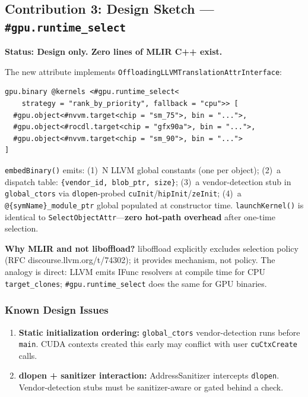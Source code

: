 \documentclass[10pt]{article}
\begin{document}
\subsection{Contribution 3: Design Sketch --- \texttt{\#gpu.runtime\_select}}

\textbf{Status: Design only. Zero lines of MLIR C++ exist.}

The new attribute implements \texttt{OffloadingLLVMTranslationAttrInterface}:

\begin{lstlisting}[language=MLIR]
gpu.binary @kernels <#gpu.runtime_select<
    strategy = "rank_by_priority", fallback = "cpu">> [
  #gpu.object<#nvvm.target<chip = "sm_75">, bin = "...">,
  #gpu.object<#rocdl.target<chip = "gfx90a">, bin = "...">,
  #gpu.object<#nvvm.target<chip = "sm_90">, bin = "...">
]
\end{lstlisting}

\texttt{embedBinary()} emits: (1)~N LLVM global constants (one per object); (2)~a dispatch table: \texttt{\{vendor\_id, blob\_ptr, size\}}; (3)~a vendor-detection stub in \texttt{global\_ctors} via \texttt{dlopen}-probed \texttt{cuInit}/\texttt{hipInit}/\texttt{zeInit}; (4)~a \texttt{@\{symName\}\_module\_ptr} global populated at constructor time.
\texttt{launchKernel()} is identical to \texttt{SelectObjectAttr}---\textbf{zero hot-path overhead} after one-time selection.

\textbf{Why MLIR and not liboffload?}
liboffload explicitly excludes selection policy (RFC discourse.llvm.org/t/74302); it provides mechanism, not policy.
The analogy is direct: LLVM emits IFunc resolvers at compile time for CPU \texttt{target\_clones}; \texttt{\#gpu.runtime\_select} does the same for GPU binaries.

\subsubsection{Known Design Issues}

\begin{enumerate}
  \item \textbf{Static initialization ordering:} \texttt{global\_ctors} vendor-detection runs before \texttt{main}. CUDA contexts created this early may conflict with user \texttt{cuCtxCreate} calls.
  \item \textbf{dlopen + sanitizer interaction:} AddressSanitizer intercepts \texttt{dlopen}. Vendor-detection stubs must be sanitizer-aware or gated behind a check.
\end{enumerate}
\end{document}
